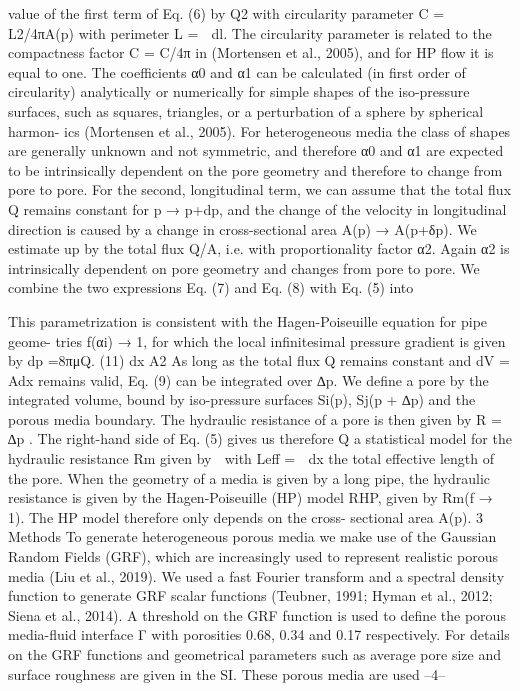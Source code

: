 value of the first term of Eq. (6) by  Q2
with circularity parameter C = L2/4πA(p) with perimeter L = 􏰈 dl. The circularity parameter is related to the compactness factor C = C/4π in (Mortensen et al.,
2005), and for HP flow it is equal to one. The coefficients α0 and α1 can be calculated
(in first order of circularity) analytically or numerically for simple shapes of the iso-pressure surfaces, such as squares, triangles, or a perturbation of a sphere by spherical harmon-
ics (Mortensen et al., 2005). For heterogeneous media the class of shapes are generally unknown and not symmetric, and therefore α0 and α1 are expected to be intrinsically dependent on the pore geometry and therefore to change from pore to pore.
For the second, longitudinal term, we can assume that the total flux Q remains constant for p → p+dp, and the change of the velocity in longitudinal direction is caused
by a change in cross-sectional area A(p) → A(p+δp). We estimate up by the total flux Q/A, i.e.
with proportionality factor α2. Again α2 is intrinsically dependent on pore geometry and changes from pore to pore. We combine the two expressions Eq. (7) and Eq. (8) with Eq. (5) into

This parametrization is consistent with the Hagen-Poiseuille equation for pipe geome-
tries f(αi) → 1, for which the local infinitesimal pressure gradient is given by
dp =8πμQ. (11)
dx A2
As long as the total flux Q remains constant and dV = Adx remains valid, Eq. (9) can
be integrated over ∆p. We define a pore by the integrated volume, bound by iso-pressure
surfaces Si(p), Sj(p + ∆p) and the porous media boundary. The hydraulic resistance
of a pore is then given by R = ∆p . The right-hand side of Eq. (5) gives us therefore Q
a statistical model for the hydraulic resistance Rm given by
􏰉
with Leff = 􏰈 dx the total effective length of the pore. When the geometry of a media is given by a long pipe, the hydraulic resistance is given by the Hagen-Poiseuille (HP) model RHP, given by Rm(f → 1). The HP model therefore only depends on the cross- sectional area A(p).
3 Methods
To generate heterogeneous porous media we make use of the Gaussian Random Fields (GRF), which are increasingly used to represent realistic porous media (Liu et al., 2019). We used a fast Fourier transform and a spectral density function to generate GRF scalar functions (Teubner, 1991; Hyman et al., 2012; Siena et al., 2014). A threshold on the GRF function is used to define the porous media-fluid interface Γ with porosities 0.68, 0.34 and 0.17 respectively. For details on the GRF functions and geometrical parameters such as average pore size and surface roughness are given in the SI. These porous media are used
–4–

